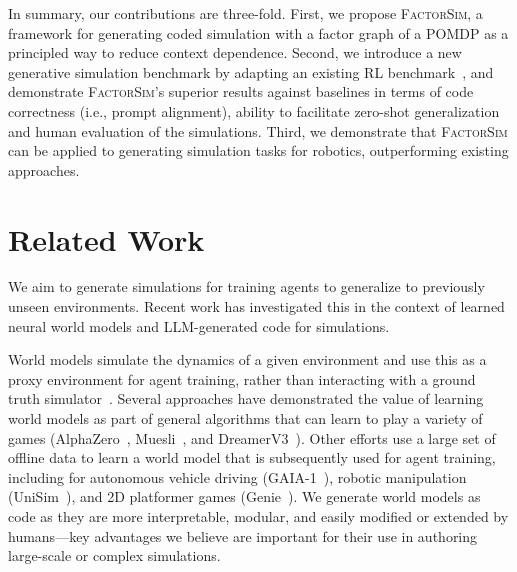 \documentclass{article}
\theoremstyle{plain}
\theoremstyle{definition}
\theoremstyle{remark}
\newcommand{\method}{\textsc{FactorSim}\xspace}
\begin{document}
In summary, our contributions are three-fold. First, we propose \method, a framework for generating coded simulation with a factor graph of a POMDP as a principled way to reduce context dependence. Second, we introduce a new generative simulation benchmark by adapting an existing RL benchmark~\cite{tasfi2016PLE}, and demonstrate \method's superior results against baselines in terms of code correctness (i.e., prompt alignment), ability to facilitate zero-shot generalization and human evaluation of the simulations.
Third, we demonstrate that \method can be applied to generating simulation tasks for robotics, outperforming existing approaches.

 
\section{Related Work}

We aim to generate simulations for training agents to generalize to previously unseen environments.
Recent work has investigated this in the context of learned neural world models and LLM-generated code for simulations.

World models simulate the dynamics of a given environment and use this as a proxy environment for agent training, rather than interacting with a ground truth simulator~\cite{ha2018worldmodel}.
Several approaches have demonstrated the value of learning world models as part of general algorithms that can learn to play a variety of games (AlphaZero~\cite{silver2018alphazero}, Muesli~\cite{hessel2021muesli}, and DreamerV3~\cite{hafner2023dreamverv3}).
Other efforts use a large set of offline data to learn a world model that is subsequently used for agent training, including for autonomous vehicle driving (GAIA-1~\cite{hu2023gaia1}), robotic manipulation (UniSim~\cite{yang2024unisim}), and 2D platformer games (Genie~\cite{bruce2024genie}).
We generate world models as code as they are more interpretable, modular, and easily modified or extended by humans---key advantages we believe are important for their use in authoring large-scale or complex simulations.
\end{document}
